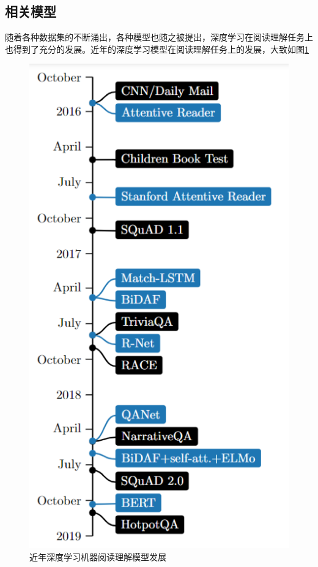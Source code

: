 \documentclass[10pt, a4]{extarticle}
\begin{document}
\subsection{相关模型}
随着各种数据集的不断涌出，各种模型也随之被提出，深度学习在阅读理解任务上也得到了充分的发展。近年的深度学习模型在阅读理解任务上的发展，大致如图\ref{mrc_dev}
\begin{figure}[H]
	\centering
	\includegraphics[height=0.8\textwidth]{figure/mrc_dev.png}
	\caption{近年深度学习机器阅读理解模型发展}
	\label{mrc_dev}
\end{figure}
\end{document}

